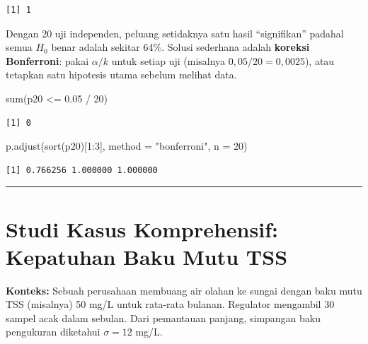 \documentclass[
  indonesian,
  letterpaper,
]{book}
\newenvironment{Shaded}{\begin{snugshade}}{\end{snugshade}}
\newcommand{\AttributeTok}[1]{\textcolor[rgb]{0.40,0.45,0.13}{#1}}
\newcommand{\DecValTok}[1]{\textcolor[rgb]{0.68,0.00,0.00}{#1}}
\newcommand{\FloatTok}[1]{\textcolor[rgb]{0.68,0.00,0.00}{#1}}
\newcommand{\FunctionTok}[1]{\textcolor[rgb]{0.28,0.35,0.67}{#1}}
\newcommand{\NormalTok}[1]{\textcolor[rgb]{0.00,0.23,0.31}{#1}}
\newcommand{\SpecialCharTok}[1]{\textcolor[rgb]{0.37,0.37,0.37}{#1}}
\newcommand{\StringTok}[1]{\textcolor[rgb]{0.13,0.47,0.30}{#1}}
\begin{document}
\begin{verbatim}
[1] 1
\end{verbatim}

Dengan 20 uji independen, peluang setidaknya satu hasil ``signifikan''
padahal semua \(H_0\) benar adalah sekitar 64\%. Solusi sederhana adalah
\textbf{koreksi Bonferroni}: pakai \(\alpha/k\) untuk setiap uji
(misalnya \(0{,}05/20 = 0{,}0025\)), atau tetapkan satu hipotesis utama
sebelum melihat data.

\begin{Shaded}
\begin{Highlighting}[]
\FunctionTok{sum}\NormalTok{(p20 }\SpecialCharTok{\textless{}=} \FloatTok{0.05} \SpecialCharTok{/} \DecValTok{20}\NormalTok{)}
\end{Highlighting}
\end{Shaded}

\begin{verbatim}
[1] 0
\end{verbatim}

\begin{Shaded}
\begin{Highlighting}[]
\FunctionTok{p.adjust}\NormalTok{(}\FunctionTok{sort}\NormalTok{(p20)[}\DecValTok{1}\SpecialCharTok{:}\DecValTok{3}\NormalTok{], }\AttributeTok{method =} \StringTok{"bonferroni"}\NormalTok{, }\AttributeTok{n =} \DecValTok{20}\NormalTok{)}
\end{Highlighting}
\end{Shaded}

\begin{verbatim}
[1] 0.766256 1.000000 1.000000
\end{verbatim}

\begin{center}\rule{0.5\linewidth}{0.5pt}\end{center}

\section{Studi Kasus Komprehensif: Kepatuhan Baku Mutu
TSS}\label{studi-kasus-komprehensif-kepatuhan-baku-mutu-tss}

\textbf{Konteks:} Sebuah perusahaan membuang air olahan ke sungai dengan
baku mutu TSS (misalnya) 50 mg/L untuk rata-rata bulanan. Regulator
mengambil 30 sampel acak dalam sebulan. Dari pemantauan panjang,
simpangan baku pengukuran diketahui \(\sigma = 12\) mg/L.
\end{document}
